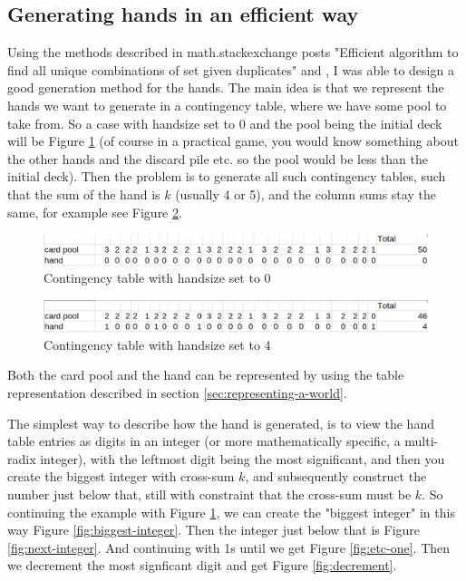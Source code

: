 \subsection{Generating hands in an efficient way} \label{sec:efficient-generation-of-hands}
Using the methods described in math.stackexchange posts "Efficient algorithm to find all unique combinations of set given duplicates" \cite{HardmathcontigencyTablePost} and \cite{GCabrecursiveGenerationPost}, I was able to design a good generation method for the hands. 
The main idea is that we represent the hands we want to generate in a contingency table, where we have some pool to take from. So a case with handsize set to 0 and the pool being the initial deck will be Figure \ref{fig:hand-pool-table} (of course in a practical game, you would know something about the other hands and the discard pile etc. so the pool would be less than the initial deck). Then the problem is to generate all such contingency tables, such that the sum of the hand is $k$ (usually 4 or 5), and the column sums stay the same, for example see Figure \ref{fig:hand-pool-table-with-hand}.

\begin{figure}
	\centering
\includegraphics[width=13cm,frame]{images/contigency_table.png}
	\caption{Contingency table with handsize set to 0}
	\label{fig:hand-pool-table}
\end{figure}


\begin{figure}
	\centering
\includegraphics[width=13cm,frame]{images/contigency_table_with_hand.png}
	\caption{Contingency table with handsize set to 4}
	\label{fig:hand-pool-table-with-hand}
\end{figure}

Both the card pool and the hand can be represented by using the table representation described in section \ref{sec:representing-a-world}.

The simplest way to describe how the hand is generated, is to view the hand table entries as digits in an integer (or more mathematically specific, a multi-radix integer), with the leftmost digit being the most significant, and then you create the biggest integer with cross-sum $k$, and subsequently construct the number just below that, still with constraint that the cross-sum must be $k$. So continuing the example with Figure \ref{fig:hand-pool-table}, we can create the "biggest integer" in this way Figure \ref{fig:biggest-integer}. Then the integer just below that is Figure \ref{fig:next-integer}. And continuing with 1s until we get Figure \ref{fig:etc-one}.
Then we decrement the most signficant digit and get Figure \ref{fig:decrement}.

